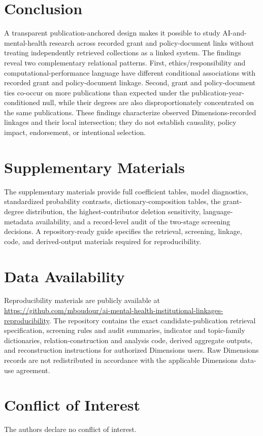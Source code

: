 \documentclass[12pt]{article}
\begin{document}
\section{Conclusion}

A transparent publication-anchored design makes it possible to study AI-and-mental-health research across recorded grant and policy-document links without treating independently retrieved collections as a linked system. The findings reveal two complementary relational patterns. First, ethics/responsibility and computational-performance language have different conditional associations with recorded grant and policy-document linkage. Second, grant and policy-document ties co-occur on more publications than expected under the publication-year-conditioned null, while their degrees are also disproportionately concentrated on the same publications. These findings characterize observed Dimensions-recorded linkages and their local intersection; they do not establish causality, policy impact, endorsement, or intentional selection.

\section*{Supplementary Materials}
The supplementary materials provide full coefficient tables, model diagnostics, standardized probability contrasts, dictionary-composition tables, the grant-degree distribution, the highest-contributor deletion sensitivity, language-metadata availability, and a record-level audit of the two-stage screening decisions. A repository-ready guide specifies the retrieval, screening, linkage, code, and derived-output materials required for reproducibility.

\section*{Data Availability}
Reproducibility materials are publicly available at \url{https://github.com/mboudour/ai-mental-health-institutional-linkages-reproducibility}. The repository contains the exact candidate-publication retrieval specification, screening rules and audit summaries, indicator and topic-family dictionaries, relation-construction and analysis code, derived aggregate outputs, and reconstruction instructions for authorized Dimensions users. Raw Dimensions records are not redistributed in accordance with the applicable Dimensions data-use agreement.

\section*{Conflict of Interest}
The authors declare no conflict of interest.
\end{document}
